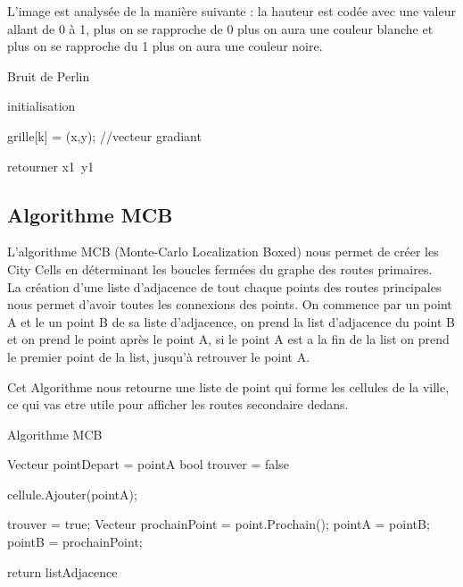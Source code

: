 L'image est analysée de la manière suivante : la hauteur est codée avec une valeur allant de 0 à 1, plus on se rapproche de 0 plus on aura une couleur blanche et plus on se rapproche du 1 plus on aura une couleur noire.

\begin{algorithm}
  \caption{Bruit de Perlin}
 
  initialisation \;
  
  grille[k] = (x,y); //vecteur gradiant
  
  	retourner x1\, y1\;
\end{algorithm}

\subsection{Algorithme MCB}
  
  L’algorithme MCB (Monte-Carlo Localization Boxed) nous permet de créer les City Cells en déterminant les boucles fermées du graphe des routes primaires.\\
  La création d'une liste d’adjacence de tout chaque points des routes principales nous permet d’avoir toutes les connexions des points.
  On commence par un point A et le un point B de sa liste d’adjacence, on prend la list d’adjacence du point B et on prend le point après 
  le point A, si le point A est a la fin de la list on prend le premier point de la list, jusqu'à retrouver le point A.

  Cet Algorithme nous retourne une liste de point qui forme les cellules de la ville, ce qui vas etre utile pour afficher les routes secondaire dedans.
   
  \begin{algorithm}
    \caption{Algorithme MCB}
    Vecteur pointDepart = pointA\;
    bool trouver = false\;

    {
      cellule.Ajouter(pointA);

      {
        {
          trouver = true;
        }
        {
          Vecteur prochainPoint = point.Prochain();
          pointA = pointB;
          pointB = prochainPoint;
        }
      }
    }

    return listAdjacence\;

  \end{algorithm}
  
